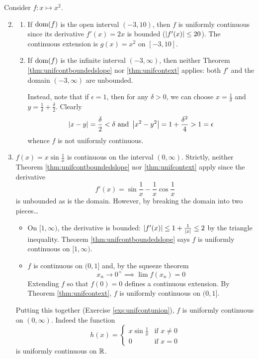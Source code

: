 \begin{examples}{}{}
	\exstart Consider $f:x\mapsto x^2$. 
	\begin{enumerate}\setcounter{enumi}{1}
	  \item[]\begin{enumerate}
	    \item If $\operatorname{dom}(f)$ is the open interval $(-3,10)$, then $f$ is uniformly continuous since its derivative $f'(x)=2x$ is bounded ($\left| f'(x)\right|\le 20$). The continuous extension is $g(x)=x^2$ on $[-3,10]$.
	    \item	If $\operatorname{dom}(f)$ is the infinite interval $(-3,\infty)$, then neither Theorem \ref{thm:unifcontboundedslope} nor \ref{thm:unifcontext} applies: both $f'$ and the domain $(-3,\infty)$ are unbounded.\par
			Instead, note that if $\epsilon=1$, then for any $\delta>0$, we can choose $x=\frac 1\delta$ and $y=\frac 1\delta+\frac\delta 2$. Clearly
			\[
				\left| x-y\right|=\frac\delta 2<\delta\text{ and }
				\left| x^2-y^2\right|=1+\frac{\delta^2}4>1=\epsilon
			\]
			whence $f$ is not uniformly continuous.
	  \end{enumerate}
		\item $f(x)=x\sin \frac 1x$ is continuous on the interval $(0,\infty)$. Strictly, neither Theorem \ref{thm:unifcontboundedslope} nor \ref{thm:unifcontext} apply since the derivative
		\[
			f'(x)=\sin\frac 1x-\frac 1x\cos\frac 1x
		\]
		is unbounded as is the domain. However, by breaking the domain into two pieces\ldots 
		\begin{itemize}
		  \item On $[1,\infty)$, the derivative is bounded: $\left| f'(x)\right|\le 1+\frac 1{\left| x\right|}\le 2$ by the triangle inequality. Theorem \ref{thm:unifcontboundedslope} says $f$ is uniformly continuous on $[1,\infty)$.
		  \item $f$ is continuous on $(0,1]$ and, by the squeeze theorem
		  \[
		  	x_n\to 0^+\implies \lim f(x_n)=0
		  \]
		  Extending $f$ so that $f(0)=0$ defines a continuous extension. By Theorem \ref{thm:unifcontext}, $f$ is uniformly continuous on $(0,1]$.
	 	\end{itemize}
	 	Putting this together (Exercise \ref{exs:unifcontunion}), $f$ is uniformly continuous on $(0,\infty)$. Indeed the function
	 	\[
	 		h(x)=
	 		\begin{cases}
	 			x\sin\frac 1x&\text{if }x\neq 0\\
	 			0&\text{if }x=0
	 		\end{cases}
	 	\]
	 	is uniformly continuous on $\mathbb{R}$.
	\end{enumerate}
\end{examples}


